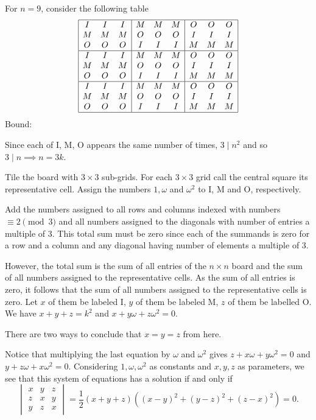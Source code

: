 For $n=9$, consider the following table\[
\begin{array}{|ccc|ccc|ccc|} \hline
I & I & I & M & M & M & O & O & O \\
M & M & M & O & O & O & I & I & I \\
O & O & O & I & I & I & M & M & M \\\hline
I & I & I & M & M & M & O & O & O \\
M & M & M & O & O & O & I & I & I \\
O & O & O & I & I & I & M & M & M \\\hline
I & I & I & M & M & M & O & O & O \\
M & M & M & O & O & O & I & I & I \\
O & O & O & I & I & I & M & M & M \\\hline
\end{array}
\]
Bound:

Since each of I, M, O appears the same number of times, $3\mid n^2$ and so $3\mid n\implies n=3k$.

Tile the board with $3\times 3$ sub-grids. For each $3\times 3$ grid call the central square its representative cell. Assign the numbers $1, \omega$ and $\omega^2$ to I, M and O, respectively.

Add the numbers assigned to all rows and columns indexed with numbers $\equiv 2 \pmod{3}$ and all numbers assigned to the diagonals with number of entries a multiple of 3. This total sum must be zero since each of the summands is zero for a row and a column and any diagonal having number of elements a multiple of 3.

However, the total sum is the sum of all entries of the $n\times n$ board and the sum of all numbers assigned to the representative cells. As the sum of all entries is zero, it follows that the sum of all numbers assigned to the representative cells is zero. Let $x$ of them be labeled I, $y$ of them be labeled M, $z$ of them be labelled O. We have $x+y+z=k^2$ and $x+y\omega+z\omega^2=0$.

There are two ways to conclude that $x=y=z$ from here.

Notice that multiplying the last equation by $\omega$ and $\omega^2$ gives $z+x\omega+y\omega^2=0$ and $y+z\omega+x\omega^2=0$. Considering $1, \omega, \omega^2$ as constants and $x, y, z$ as parameters, we see that this system of equations has a solution if and only if \[\begin{vmatrix}x&y&z\\z&x&y\\y&z&x\end{vmatrix}=\frac{1}{2}(x+y+z)\left((x-y)^2+(y-z)^2+(z-x)^2\right)=0.\]

